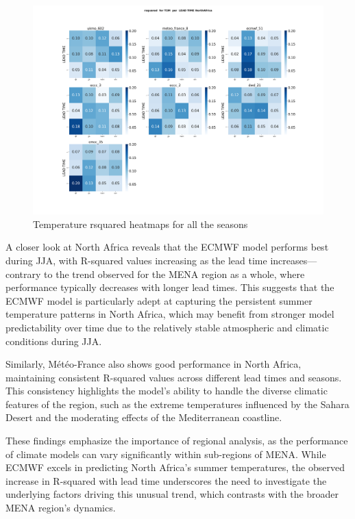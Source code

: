 \begin{figure}[H]
    \centering
    \includegraphics[width=1\linewidth]{plots/det/rsquared/rsquared_T2M_NorthAfrica.png}
    \caption{Temperature rsquared heatmaps for all the seasons}
    \label{fig:CORR_djf_t2m}
\end{figure}
A closer look at North Africa reveals that the ECMWF model performs best during JJA, with R-squared values increasing as the lead time increases—contrary to the trend observed for the MENA region as a whole, where performance typically decreases with longer lead times. This suggests that the ECMWF model is particularly adept at capturing the persistent summer temperature patterns in North Africa, which may benefit from stronger model predictability over time due to the relatively stable atmospheric and climatic conditions during JJA.

Similarly, Météo-France also shows good performance in North Africa, maintaining consistent R-squared values across different lead times and seasons. This consistency highlights the model’s ability to handle the diverse climatic features of the region, such as the extreme temperatures influenced by the Sahara Desert and the moderating effects of the Mediterranean coastline.

These findings emphasize the importance of regional analysis, as the performance of climate models can vary significantly within sub-regions of MENA. While ECMWF excels in predicting North Africa’s summer temperatures, the observed increase in R-squared with lead time underscores the need to investigate the underlying factors driving this unusual trend, which contrasts with the broader MENA region’s dynamics.



